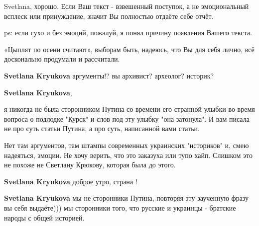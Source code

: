 \begin{itemize}
\begin{itemize}
Svetlana, хорошо. Если Ваш текст - взвешенный поступок, а не эмоциональный
всплеск или принуждение, значит Вы полностью отдаёте себе отчёт.

ps: если сухо и без эмоций, пожалуй, я понял причину появления Вашего текста.

«Цыплят по осени считают», выборам быть, надеюсь, что Вы для себя лично, всё
досконально продумали и рассчитали.


 
\textbf{Svetlana Kryukova} аргументы!? вы архивист? археолог? историк?

 
\textbf{Svetlana Kryukova}, 

я никогда не была сторонником Путина со времени его странной улыбки во время
вопроса о подлодке "Курск" и слов под эту улыбку "она затонула". И вам писала
не про суть статьи Путина, а про суть, написанной вами статьи. 

Нет там аргументов, там штампы современных украинских "историков" и, смею
надеяться, эмоции. Не хочу верить, что это заказуха или тупо хайп. Слишком это
не похоже не Светлану Крюкову, которая была до этого.

 
\textbf{Svetlana Kryukova} доброе утро, страна !

 
\textbf{Svetlana Kryukova} мы не сторонники Путина, повторяя эту заученную фразу вы себя выдаёте))) мы сторонники того, что русские и украинцы - братские народы с общей историей.

 

\end{itemize}
\end{itemize}
